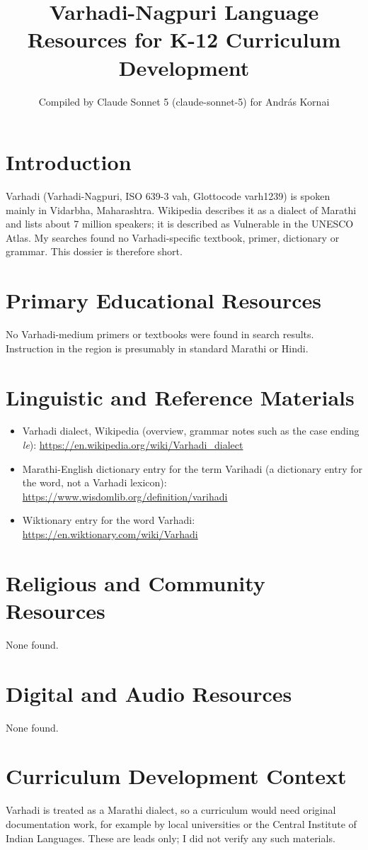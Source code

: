 \documentclass[12pt]{article}
\title{Varhadi-Nagpuri Language Resources for K-12 Curriculum Development}
\author{Compiled by Claude Sonnet 5 (claude-sonnet-5) for Andr\'as Kornai}
\date{}
\begin{document}
\maketitle
\section{Introduction}
Varhadi (Varhadi-Nagpuri, ISO 639-3 vah, Glottocode varh1239) is spoken mainly in Vidarbha, Maharashtra. Wikipedia describes it as a dialect of Marathi and lists about 7 million speakers; it is described as Vulnerable in the UNESCO Atlas. My searches found no Varhadi-specific textbook, primer, dictionary or grammar. This dossier is therefore short.
\section{Primary Educational Resources}
No Varhadi-medium primers or textbooks were found in search results. Instruction in the region is presumably in standard Marathi or Hindi.
\section{Linguistic and Reference Materials}
\begin{itemize}
\item Varhadi dialect, Wikipedia (overview, grammar notes such as the case ending \emph{le}): \url{https://en.wikipedia.org/wiki/Varhadi_dialect}
\item Marathi-English dictionary entry for the term Varihadi (a dictionary entry for the word, not a Varhadi lexicon): \url{https://www.wisdomlib.org/definition/varihadi}
\item Wiktionary entry for the word Varhadi: \url{https://en.wiktionary.com/wiki/Varhadi}
\end{itemize}
\section{Religious and Community Resources}
None found.
\section{Digital and Audio Resources}
None found.
\section{Curriculum Development Context}
Varhadi is treated as a Marathi dialect, so a curriculum would need original documentation work, for example by local universities or the Central Institute of Indian Languages. These are leads only; I did not verify any such materials.
\end{document}
